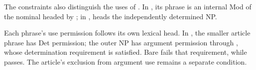 The constraints also distinguish the uses of . In , its phrase is an internal Mod of the nominal headed by ; in ,  heads the independently determined NP.

Each phrase's use permission follows its own lexical head. In , the smaller article phrase has Det permission; the outer NP has argument permission through , whose determination requirement is satisfied. Bare  fails that requirement, while  passes. The article's exclusion from argument use remains a separate condition.

